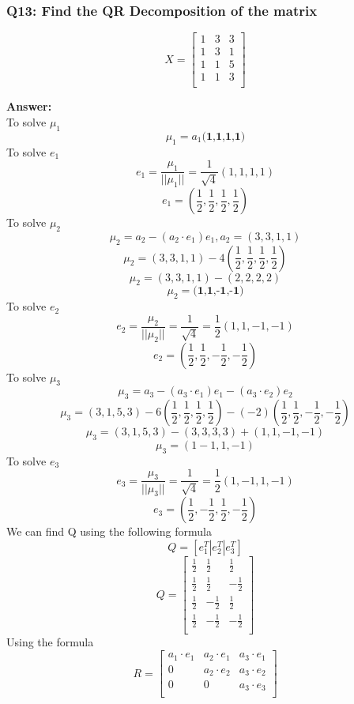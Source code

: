 \documentclass[8pt]{article}
\begin{document}
\subsubsection*{Q13: Find the QR Decomposition of the matrix}

\[
  X=
  \left[ {\begin{array}{ccc}
   1 & 3 & 3\\
   1 & 3 & 1\\
   1 & 1 & 5\\
   1 & 1 & 3\\
  \end{array} } \right]
\]

\textbf{Answer:}\\
To solve $\mu_{1}$
\[
\mu_{1} = a_{1} \textbf{(1,1,1,1)}
\]
To solve $e_{1}$
\[
e_{1} = \frac{\mu_{1}}{||\mu_{1}||} = \frac{1}{\sqrt{4}} (1,1,1,1) 
\]
\[
e_{1}= (\frac{1}{2}, \frac{1}{2}, \frac{1}{2}, \frac{1}{2})
\]
To solve $\mu_{2}$
\[
\mu_2 = a_2 - (a_2 \cdot e_1)e_1, a_2 = (3,3,1,1)
\]
\[
\mu_2 = (3,3,1,1) - 4(\frac{1}{2}, \frac{1}{2}, \frac{1}{2}, \frac{1}{2})
\]
\[
\mu_2 = (3,3,1,1) - (2,2,2,2)
\]
\[
\mu_2 = \textbf{(1,1,-1,-1)}
\]
To solve $e_{2}$
\[
e_2 = \frac{\mu_2}{||\mu_2||} = \frac{1}{\sqrt{4}} = \frac{1}{2}(1,1,-1,-1)
\]
\[
e_2 = (\frac{1}{2}, \frac{1}{2}, -\frac{1}{2},- \frac{1}{2})
\]
To solve $\mu_{3}$
\[
\mu_3 = a_3 - (a_3 \cdot e_1)e_1 - (a_3 \cdot e_2)e_2
\]
\[
\mu_3 = (3,1,5,3) - 6(\frac{1}{2},\frac{1}{2},\frac{1}{2},\frac{1}{2}) - (-2)(\frac{1}{2}, \frac{1}{2}, -\frac{1}{2},- \frac{1}{2})
\]
\[
\mu_3 = (3,1,5,3) - (3,3,3,3) + (1,1,-1,-1)
\]
\[
\mu_3 = (1 -1, 1, -1)
\]
To solve $e_{3}$
\[
e_3 = \frac{\mu_3}{||\mu_3||} = \frac{1}{\sqrt{4}} = \frac{1}{2}(1, -1, 1, -1)
\]
\[
e_3 = (\frac{1}{2}, - \frac{1}{2}, \frac{1}{2}, -\frac{1}{2})
\]
We can find Q using the following formula
\[
Q=[e_1^T | e_2^T | e_3^T]
\]
\[
  Q=
  \left[ {\begin{array}{ccc}
   \frac{1}{2} & \frac{1}{2} & \frac{1}{2}\\
   \frac{1}{2} & \frac{1}{2} & -\frac{1}{2}\\
   \frac{1}{2} & -\frac{1}{2} & \frac{1}{2}\\
   \frac{1}{2} & -\frac{1}{2} & -\frac{1}{2}\\
  \end{array} } \right]
\]
Using the formula 
\[
  R=
  \left[ {\begin{array}{ccc}
   a_1 \cdot e_1 & a_2 \cdot e_1 & a_3 \cdot e_1\\
   0 & a_2 \cdot e_2 & a_3 \cdot e_2\\
   0 & 0 & a_3 \cdot e_3\\
  \end{array} } \right]
\]
\end{document}

